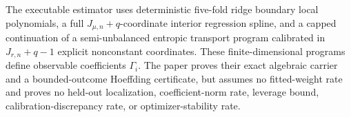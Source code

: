 The executable estimator uses deterministic five-fold ridge boundary local polynomials, a full \(J_{\mu,n}+q\)-coordinate interior regression spline, and a capped continuation of a semi-unbalanced entropic transport program calibrated in \(J_{r,n}+q-1\) explicit nonconstant coordinates. These finite-dimensional programs define observable coefficients \(\Gamma_i\). The paper proves their exact algebraic carrier and a bounded-outcome Hoeffding certificate, but assumes no fitted-weight rate and proves no held-out localization, coefficient-norm rate, leverage bound, calibration-discrepancy rate, or optimizer-stability rate.